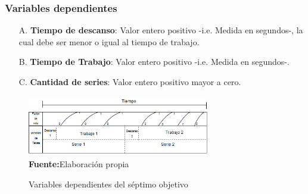 \subsubsection{Variables dependientes} \label{vr:7o:dep}
\begin{enumerate}
	\item[A.] \textbf{Tiempo de descanso}: Valor entero positivo -i.e. Medida en segundos-, la cual debe ser menor o igual al tiempo de trabajo.
	\item[B.] \textbf{Tiempo de Trabajo}: Valor entero positivo -i.e. Medida en segundos-.
	\item[C.] \textbf{Cantidad de series}: Valor entero positivo mayor a cero.
\end{enumerate}	
\begin{figure}[H]
	\caption{Variables dependientes del s\'eptimo  objetivo}
	\label{fig:vardep7}
	\centering
	\includegraphics[width=300px,height=100px]{graphics/var-7obj.png} \\
	\textbf{Fuente:}Elaboraci\'on propia 
\end{figure}
\medbreak
